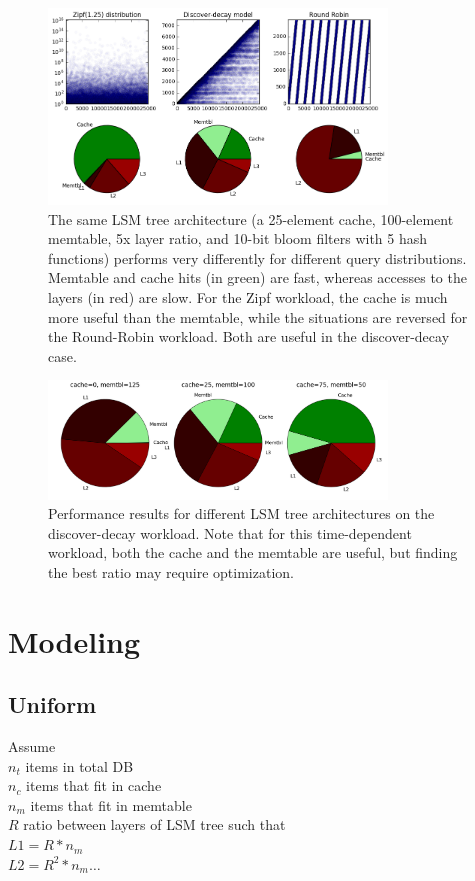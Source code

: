 \documentclass{sig-alternate-05-2015}
\begin{document}
\begin{figure}[!htb]
\begin{center}
\includegraphics[width=9cm]{sametree-diffqs.png}
\end{center}
\caption{The same LSM tree architecture (a 25-element cache, 100-element
memtable, 5x layer ratio, and 10-bit bloom filters with 5 hash functions)
performs very differently for different query distributions. Memtable and cache
hits (in green) are fast, whereas accesses to the layers (in red) are slow. For
the Zipf workload, the cache is much more useful than the memtable, while the
situations are reversed for the Round-Robin workload. Both are useful in the
discover-decay case.}
\label{fig:sametree-diffqs}
\end{figure}

\begin{figure}[!htb]
\begin{center}
\includegraphics[width=9cm]{sameqs-difftree.png}
\end{center}
\caption{Performance results for different LSM tree architectures on the
discover-decay workload. Note that for this time-dependent workload, both the
cache and the memtable are useful, but finding the best ratio may require
optimization.}
\label{fig:sameqs-difftree}
\end{figure}

\section{Modeling}
\subsection{Uniform}
Assume \\
$n_t$ items in total DB \\
$n_c$ items that fit in cache\\
$n_m$ items that fit in memtable\\
$R$ ratio between layers of LSM tree such that \\
$L1 = R * n_m$ \\
$L2 = R^2 * n_m \dots$ \\ 
\end{document}
